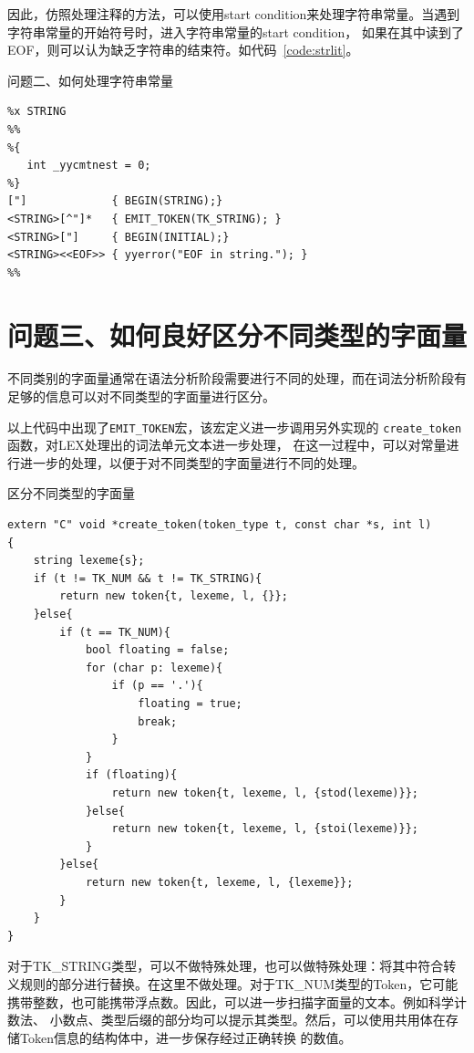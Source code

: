 \documentclass[a4paper,twoside]{article}
\begin{document}
\begin{spacing}{1.2}
因此，仿照处理注释的方法，可以使用start condition来处理字符串常量。当遇到字符串常量的开始符号时，进入字符串常量的start condition，
如果在其中读到了EOF，则可以认为缺乏字符串的结束符。如代码~\ref{code:strlit}。
\begin{listing}[htb]
	\caption{问题二、如何处理字符串常量}
	\label{code:strlit}
	\begin{verbatim}
%x STRING
%%
%{
   int _yycmtnest = 0;
%}
["]             { BEGIN(STRING);}
<STRING>[^"]*   { EMIT_TOKEN(TK_STRING); }
<STRING>["]     { BEGIN(INITIAL);}
<STRING><<EOF>> { yyerror("EOF in string."); }
%%
	\end{verbatim}
\end{listing}

\section{问题三、如何良好区分不同类型的字面量}

不同类别的字面量通常在语法分析阶段需要进行不同的处理，而在词法分析阶段有足够的信息可以对不同类型的字面量进行区分。

以上代码中出现了\texttt{EMIT\_TOKEN}宏，该宏定义进一步调用另外实现的
\texttt{create\_token}函数，对LEX处理出的词法单元文本进一步处理，
在这一过程中，可以对常量进行进一步的处理，以便于对不同类型的字面量进行不同的处理。

\begin{listing}[htb]
	\caption{区分不同类型的字面量}
	\label{code:token}
	\begin{verbatim}
extern "C" void *create_token(token_type t, const char *s, int l)
{
	string lexeme{s};
	if (t != TK_NUM && t != TK_STRING){
		return new token{t, lexeme, l, {}};
	}else{
		if (t == TK_NUM){
			bool floating = false;
			for (char p: lexeme){
				if (p == '.'){
					floating = true;
					break;
				}
			}
			if (floating){
				return new token{t, lexeme, l, {stod(lexeme)}};
			}else{
				return new token{t, lexeme, l, {stoi(lexeme)}};
			}
		}else{
			return new token{t, lexeme, l, {lexeme}};
		}
	}
}
	\end{verbatim}
\end{listing}

对于TK\_STRING类型，可以不做特殊处理，也可以做特殊处理：将其中符合转义规则的部分进行替换。在这里不做处理。对于TK\_NUM类型的Token，它可能携带整数，也可能携带浮点数。因此，可以进一步扫描字面量的文本。例如科学计数法、
小数点、类型后缀的部分均可以提示其类型。然后，可以使用共用体在存储Token信息的结构体中，进一步保存经过正确转换
的数值。


\end{spacing}
\end{document}
